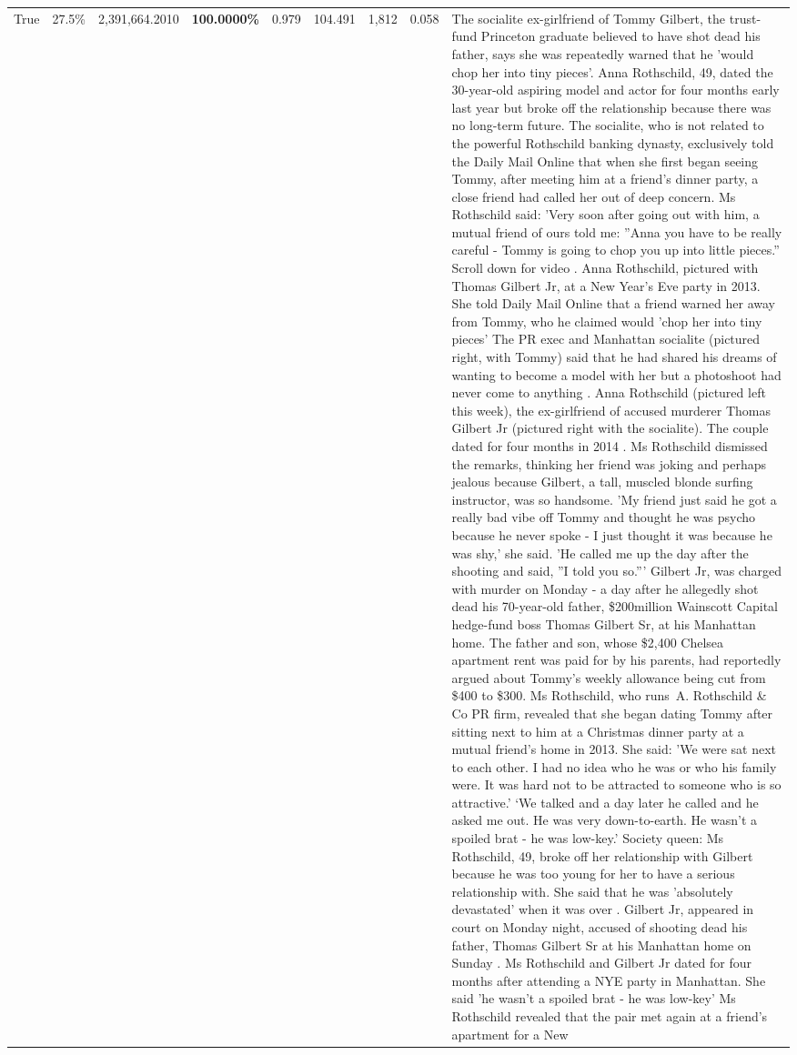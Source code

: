 \begin{table}[H]
\begin{tabular}{lllrlllll}
True & 27.5\% & 2,391,664.2010 & \bfseries \color{red} 100.0000\% & 0.979 & 104.491 & 1,812 & 0.058 & The socialite ex-girlfriend of Tommy Gilbert, the trust-fund Princeton graduate believed to have shot dead his father, says she was repeatedly warned that he 'would chop her into tiny pieces'. Anna Rothschild, 49, dated the 30-year-old aspiring model and actor for four months early last year but broke off the relationship because there was no long-term future. The socialite, who is not related to the powerful Rothschild banking dynasty, exclusively told the Daily Mail Online that when she first began seeing Tommy, after meeting him at a friend's dinner party, a close friend had called her out of deep concern. Ms Rothschild said: 'Very soon after going out with him, a mutual friend of ours told me: ''Anna you have to be really careful - Tommy is going to chop you up into little pieces.'' Scroll down for video . Anna Rothschild, pictured with Thomas Gilbert Jr, at a New Year's Eve party in 2013. She told Daily Mail Online that a friend warned her away from Tommy, who he claimed would 'chop her into tiny pieces' The PR exec and Manhattan socialite (pictured right, with Tommy) said that he had shared his dreams of wanting to become a model with her but a photoshoot had never come to anything . Anna Rothschild (pictured left this week), the ex-girlfriend of accused murderer Thomas Gilbert Jr (pictured right with the socialite). The couple dated for four months in 2014 . Ms Rothschild dismissed the remarks, thinking her friend was joking and perhaps jealous because Gilbert, a tall, muscled blonde surfing instructor, was so handsome. 'My friend just said he got a really bad vibe off Tommy and thought he was psycho because he never spoke - I just thought it was because he was shy,' she said. 'He called me up the day after the shooting and said, ''I told you so.''' Gilbert Jr, was charged with murder on Monday - a day after he allegedly shot dead his 70-year-old father, \$200million Wainscott Capital hedge-fund boss Thomas Gilbert Sr, at his Manhattan home. The father and son, whose \$2,400 Chelsea apartment rent was paid for by his parents, had reportedly argued about Tommy's weekly allowance being cut from \$400 to \$300. Ms Rothschild, who runs A. Rothschild \& Co PR firm, revealed that she began dating Tommy after sitting next to him at a Christmas dinner party at a mutual friend's home in 2013. She said: 'We were sat next to each other. I had no idea who he was or who his family were. It was hard not to be attracted to someone who is so attractive.' ‘We talked and a day later he called and he asked me out. He was very down-to-earth. He wasn’t a spoiled brat - he was low-key.’ Society queen: Ms Rothschild, 49, broke off her relationship with Gilbert because he was too young for her to have a serious relationship with. She said that he was 'absolutely devastated' when it was over . Gilbert Jr, appeared in court on Monday night, accused of shooting dead his father, Thomas Gilbert Sr at his Manhattan home on Sunday . Ms Rothschild and Gilbert Jr dated for four months after attending a NYE party in Manhattan. She said 'he wasn't a spoiled brat - he was low-key' Ms Rothschild revealed that the pair met again at a friend’s apartment for a New 
\end{tabular}
\end{table}
